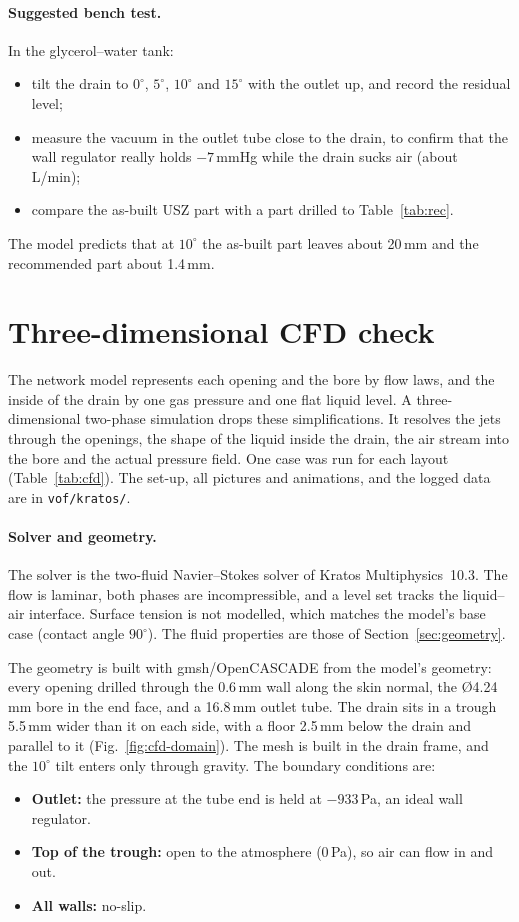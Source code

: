 \documentclass[10pt,a4paper]{article}
\begin{document}
\paragraph{Suggested bench test.} In the glycerol--water tank:
\begin{itemize}
\item tilt the drain to $0^\circ$, $5^\circ$, $10^\circ$ and $15^\circ$ with the outlet up, and record the residual level;
\item measure the vacuum in the outlet tube close to the drain, to confirm that the wall regulator really holds $-7$\,mmHg while the drain sucks air (about \numairHi\,L/min);
\item compare the as-built USZ part with a part drilled to Table~\ref{tab:rec}.
\end{itemize}
The model predicts that at $10^\circ$ the as-built part leaves about 20\,mm and the recommended part about 1.4\,mm.

\section{Three-dimensional CFD check}\label{sec:cfd}
The network model represents each opening and the bore by flow laws, and the inside of the drain by one gas pressure and one flat liquid level. A three-dimensional two-phase simulation drops these simplifications. It resolves the jets through the openings, the shape of the liquid inside the drain, the air stream into the bore and the actual pressure field. One case was run for each layout (Table~\ref{tab:cfd}). The set-up, all pictures and animations, and the logged data are in \texttt{vof/kratos/}.

\paragraph{Solver and geometry.} The solver is the two-fluid Navier--Stokes solver of Kratos Multiphysics~10.3. The flow is laminar, both phases are incompressible, and a level set tracks the liquid--air interface. Surface tension is not modelled, which matches the model's base case (contact angle $90^\circ$). The fluid properties are those of Section~\ref{sec:geometry}.

The geometry is built with gmsh/OpenCASCADE from the model's geometry: every opening drilled through the 0.6\,mm wall along the skin normal, the \O4.24\,mm bore in the end face, and a 16.8\,mm outlet tube. The drain sits in a trough 5.5\,mm wider than it on each side, with a floor 2.5\,mm below the drain and parallel to it (Fig.~\ref{fig:cfd-domain}). The mesh is built in the drain frame, and the $10^\circ$ tilt enters only through gravity. The boundary conditions are:
\begin{itemize}
\item \textbf{Outlet:} the pressure at the tube end is held at $-933$\,Pa, an ideal wall regulator.
\item \textbf{Top of the trough:} open to the atmosphere (0\,Pa), so air can flow in and out.
\item \textbf{All walls:} no-slip.
\end{itemize}
\end{document}

